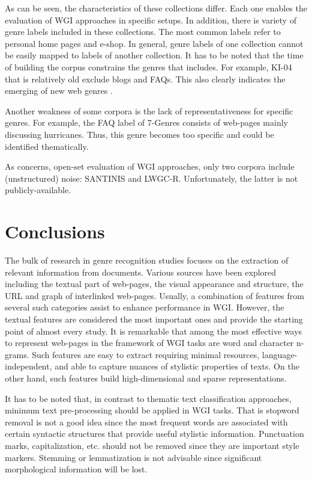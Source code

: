 As can be seen, the characteristics of these collections differ. Each one enables the evaluation of WGI approaches in specific setups. In addition, there is variety of genre labels included in these collections. The most common labels refer to personal home pages and e-shop. In general, genre labels of one collection cannot be easily mapped to labels of another collection. It has to be noted that the time of building the corpus constrains the genres that includes. For example, KI-04 that is relatively old exclude blogs and FAQs. This also clearly indicates the emerging of new web genres \parencite{dash2018history}. 

Another weakness of some corpora is the lack of representativeness for specific genres. For example, the FAQ label of 7-Genres consists of web-pages mainly discussing hurricanes. Thus, this genre becomes too specific and could be identified thematically. 

As concerns, open-set evaluation of WGI approaches, only two corpora include (unstructured) noise: SANTINIS and LWGC-R. Unfortunately, the latter is not publicly-available. 

\section{Conclusions}\label{chap:relevant_work:sec:intro}

The bulk of research in genre recognition studies focuses on the extraction of relevant information from documents. Various sources have been explored including the textual part of web-pages, the visual appearance and structure, the URL and graph of interlinked web-pages. Usually, a combination of features from several such categories assist to enhance performance in WGI. However, the textual features are considered the most important ones and provide the starting point of almost every study. It is remarkable that among the most effective ways to represent web-pages in the framework of WGI tasks are word and character n-grams. Such features are easy to extract requiring minimal resources, language-independent, and able to capture nuances of stylistic properties of texts. On the other hand, such features build high-dimensional and sparse representations.

It has to be noted that, in contrast to thematic text classification approaches, minimum text pre-processing should be applied in WGI tasks. That is stopword removal is not a good idea since the most frequent words are associated with certain syntactic structures that provide useful stylistic information. Punctuation marks, capitalization, etc. should not be removed since they are important style markers. Stemming or lemmatization is not advisable since significant morphological information will be lost.

